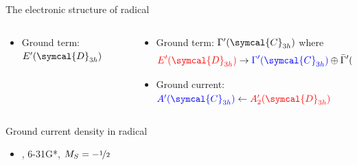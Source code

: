 \begin{frame}{The electronic structure of  radical}
\begin{itemize}
      \begin{columns}[T]
        \begin{column}{.40\textwidth}
          \begin{itemize}
            \item<3-> Ground term: \textcolor{red}{$E'(\symcal{D}_{3h})$}
          \end{itemize}
        \end{column}
        \begin{column}{.50\textwidth}
          \begin{itemize}
            \item<3-> Ground term: \textcolor{blue}{$\Gamma'(\symcal{C}_{3h})$} where
            \begin{equation*}
              \textcolor{red}{E'(\symcal{D}_{3h})} \to \textcolor{blue}{\Gamma'(\symcal{C}_{3h})} \oplus \bar{\Gamma}'(\symcal{C}_{3h})
            \end{equation*}
            \item<4-> Ground current: $\textcolor{blue}{A'(\symcal{C}_{3h})} \leftarrow \textcolor{red}{A_2'(\symcal{D}_{3h})}$
          \end{itemize}
        \end{column}
      \end{columns}
    \end{itemize}
  \end{frame}


  \begin{frame}{Ground  current density in  radical}
    \begin{itemize}
      \item<1-> , 6-31G*, $M_S = -\nicefrac{1}{2}$
    \end{itemize}
  \end{frame}

